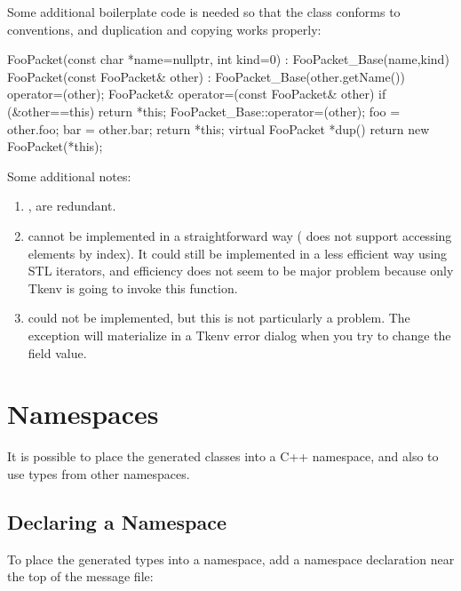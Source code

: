 Some additional boilerplate code is needed so that the class conforms
to conventions, and duplication and copying works properly:

\begin{cpp}
    FooPacket(const char *name=nullptr, int kind=0) : FooPacket_Base(name,kind) {
    }
    FooPacket(const FooPacket& other) : FooPacket_Base(other.getName()) {
        operator=(other);
    }
    FooPacket& operator=(const FooPacket& other) {
        if (&other==this) return *this;
        FooPacket_Base::operator=(other);
        foo = other.foo;
        bar = other.bar;
        return *this;
    }
    virtual FooPacket *dup() {
        return new FooPacket(*this);
    }
\end{cpp}

Some additional notes:

\begin{enumerate}
  \item{,  are redundant.}
  \item{ cannot be implemented in a straightforward way
     ( does not support accessing elements by index).
     It could still be implemented in a less efficient way using STL iterators,
     and efficiency does not seem to be major problem because only Tkenv
     is going to invoke this function.}
  \item{ could not be implemented, but this
     is not particularly a problem. The exception will materialize in a
     Tkenv error dialog when you try to change the field value.}
\end{enumerate}



\section{Namespaces}
\label{sec:msg-defs:namespaces}

It is possible to place the generated classes into a C++ namespace,
and also to use types from other namespaces.

\subsection{Declaring a Namespace}
\label{sec:msg-defs:declaring-a-namespace}

To place the generated types into a namespace, add a namespace declaration
near the top of the message file:

